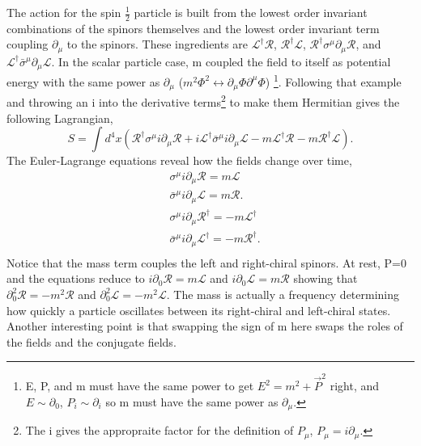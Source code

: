 \documentclass[12pt]{article}
\begin{document}
The action for the spin $\frac{1}{2}$ particle is built from the lowest order invariant combinations of the spinors themselves and the lowest order invariant term coupling $\partial_\mu$ to the spinors. These ingredients are $\mathcal{L}^\dagger\mathcal{R}$, $\mathcal{R}^\dagger\mathcal{L}$, $\mathcal{R}^\dagger\sigma^\mu\partial_\mu\mathcal{R}$, and $\mathcal{L}^\dagger\bar{\sigma}^\mu\partial_\mu\mathcal{L}$. In the scalar particle case, m coupled the field to itself as potential energy with the same power as $\partial_\mu$ ($m^2\Phi^2\leftrightarrow\partial_\mu\Phi\partial^\mu\Phi$) \footnote{E, P, and m must have the same power to get $E^2 = m^2 + \vec{P}^2$ right, and $E \sim \partial_0$, $P_i \sim \partial_i$ so m must have the same power as $\partial_\mu$.}. Following that example and throwing an i into the derivative terms\footnote{The i gives the appropraite factor for the definition of $P_\mu$, $P_\mu = i\partial_\mu$.} to make them Hermitian gives the following Lagrangian,  
\begin{equation}
S = \int d^4x \left( \mathcal{R}^\dagger\sigma^\mu i\partial_\mu\mathcal{R} + i\mathcal{L}^\dagger\bar{\sigma}^\mu i\partial_\mu\mathcal{L} 
- m\mathcal{L}^\dagger\mathcal{R} - m\mathcal{R}^\dagger\mathcal{L} \right).
\end{equation} 
The Euler-Lagrange equations reveal how the fields change over time,
\begin{equation}
\begin{split}
& \sigma^\mu i\partial_\mu\mathcal{R} = m\mathcal{L} \\
& \bar{\sigma}^\mu i\partial_\mu\mathcal{L} = m\mathcal{R}. \\
& \sigma^\mu i\partial_\mu\mathcal{R}^\dagger = -m\mathcal{L}^\dagger \\
& \bar{\sigma}^\mu i\partial_\mu\mathcal{L}^\dagger = -m\mathcal{R}^\dagger. \\
\end{split}
\end{equation}
Notice that the mass term couples the left and right-chiral spinors. At rest, P=0 and the equations reduce to $i\partial_0\mathcal{R} = m\mathcal{L}$ and $i\partial_0\mathcal{L} = m\mathcal{R}$ showing that $\partial^2_0 \mathcal{R} = -m^2\mathcal{R}$ and $\partial^2_0 \mathcal{L} = -m^2\mathcal{L}$. The mass is actually a frequency determining how quickly a particle oscillates between its right-chiral and left-chiral states. Another interesting point is that swapping the sign of m here swaps the roles of the fields and the conjugate fields. 
\end{document}

